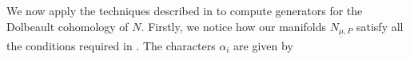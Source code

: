 \documentclass[a4paper, 11pt]{amsart}
\theoremstyle{plain}
\newtheorem{proposizione}{Proposition} [section]
\theoremstyle{definition}
\newcommand{\C}{\mathbb{C}}
\numberwithin{equation}{section}
\begin{document}

We now apply the techniques described in \cite{Kasuya} to compute generators for the Dolbeault cohomology of $N$. Firstly, we notice how our manifolds $N_{\underline{\mu}, P}$ satisfy all the conditions required in \cite[assumption 1.1]{Kasuya}. The characters $\alpha_{i}$ are given by 
\end{document}

